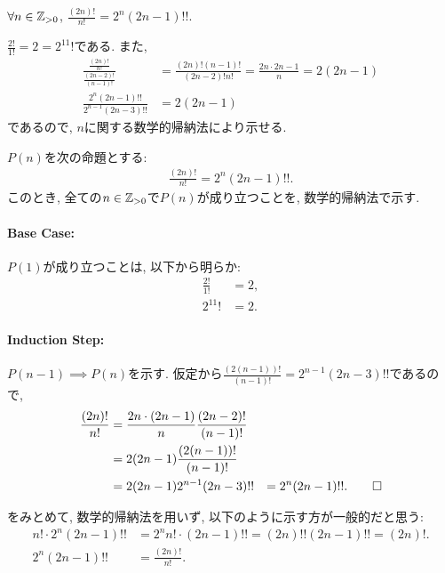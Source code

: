 \begin{prop}
  \label{p:20230725}
  $\forall n\in\mathbb{Z}_{>0}$,
  $\frac{(2n)!}{n!}=2^n(2n-1)!!$.
\end{prop}
\begin{proof**}
  $\frac{2!}{1!}=2=2^11!$である.
  また,
  \begin{align*}
    \frac{\frac{(2n)!}{n!}}{\frac{(2n-2)!}{(n-1)!}}
    &=\frac{(2n)!(n-1)!}{(2n-2)!n!}
    =\frac{2n\cdot 2n-1}{n}=2(2n-1)\\
    \frac{2^n(2n-1)!!}{2^{n-1}(2n-3)!!}
    &=2(2n-1)
  \end{align*}
  であるので,
  $n$に関する数学的帰納法により示せる.
\end{proof**}
\begin{proof*}
  $P(n)$を次の命題とする:
  \begin{align*}
    \frac{(2n)!}{n!}=2^n(2n-1)!!.
  \end{align*}
  このとき,
  全ての$n\in\mathbb{Z}_{>0}$で$P(n)$が成り立つことを,
  数学的帰納法で示す.

  \paragraph{Base Case:}
  $P(1)$が成り立つことは, 以下から明らか:
  \begin{align*}
    \frac{2!}{1!}&=2,\\
    2^11!&=2.
  \end{align*}

  \paragraph{Induction Step:}
  $P(n-1)\implies P(n)$を示す.
  仮定から$\frac{(2(n-1))!}{(n-1)!}=2^{n-1}(2n-3)!!$であるので,
  \begin{align*}
    \frac{(2n)!}{n!}
    &=\frac{2n\cdot (2n-1)}{n}\frac{(2n-2)!}{(n-1)!}\\
    &=2(2n-1)\frac{(2(n-1))!}{(n-1)!}\\
    &=2(2n-1)2^{n-1}(2n-3)!!
    &=2^n(2n-1)!!
    .\qedhere
  \end{align*}
\end{proof*}
\begin{rem}
  をみとめて,
  数学的帰納法を用いず, 以下のように示す方が一般的だと思う:
  \begin{align*}
    n!\cdot 2^n (2n-1)!!
    &=2^n n!\cdot (2n-1)!!
    =(2n)!! (2n-1)!!
    =(2n)!.\\
    2^n (2n-1)!!&=\frac{(2n)!}{n!}.
  \end{align*}
\end{rem}


